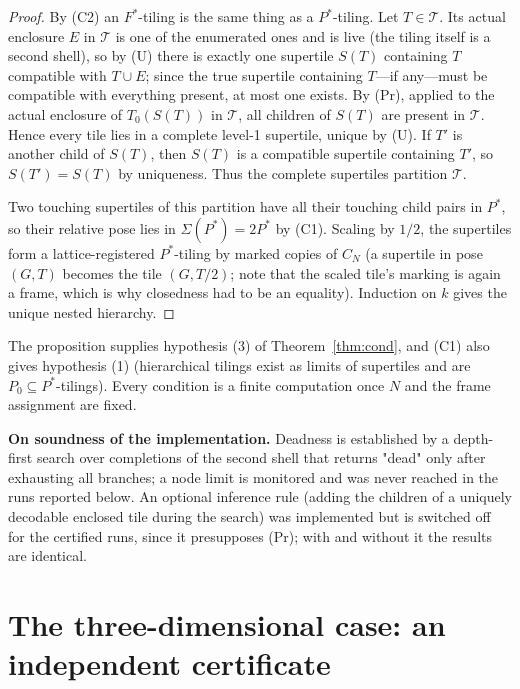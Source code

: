 \documentclass[11pt,a4paper]{article}
\theoremstyle{plain}
\theoremstyle{definition}
\begin{document}
\begin{proof}
By (C2) an $F^*$-tiling is the same thing as a $P^*$-tiling. Let $T \in \mathcal{T}$. Its actual enclosure $E$ in $\mathcal{T}$ is one of the enumerated ones and is live (the tiling itself is a second shell), so by (U) there is exactly one supertile $S(T)$ containing $T$ compatible with $T \cup E$; since the true supertile containing $T$---if any---must be compatible with everything present, at most one exists. By (Pr), applied to the actual enclosure of $T_0(S(T))$ in $\mathcal{T}$, all children of $S(T)$ are present in $\mathcal{T}$. Hence every tile lies in a complete level-1 supertile, unique by (U). If $T'$ is another child of $S(T)$, then $S(T)$ is a compatible supertile containing $T'$, so $S(T') = S(T)$ by uniqueness. Thus the complete supertiles partition $\mathcal{T}$.

Two touching supertiles of this partition have all their touching child pairs in $P^*$, so their relative pose lies in $\Sigma(P^*) = 2P^*$ by (C1). Scaling by $1/2$, the supertiles form a lattice-registered $P^*$-tiling by marked copies of $C_N$ (a supertile in pose $(G,T)$ becomes the tile $(G,T/2)$; note that the scaled tile's marking is again a frame, which is why closedness had to be an equality). Induction on $k$ gives the unique nested hierarchy.
\end{proof}


The proposition supplies hypothesis (3) of Theorem~\ref{thm:cond}, and (C1) also gives hypothesis (1) (hierarchical tilings exist as limits of supertiles and are $P_0 \subseteq P^*$-tilings). Every condition is a finite computation once $N$ and the frame assignment are fixed.

\textbf{On soundness of the implementation.} Deadness is established by a depth-first search over completions of the second shell that returns "dead" only after exhausting all branches; a node limit is monitored and was never reached in the runs reported below. An optional inference rule (adding the children of a uniquely decodable enclosed tile during the search) was implemented but is switched off for the certified runs, since it presupposes (Pr); with and without it the results are identical.

\section{The three-dimensional case: an independent certificate}\label{sec:N3}
\end{document}
